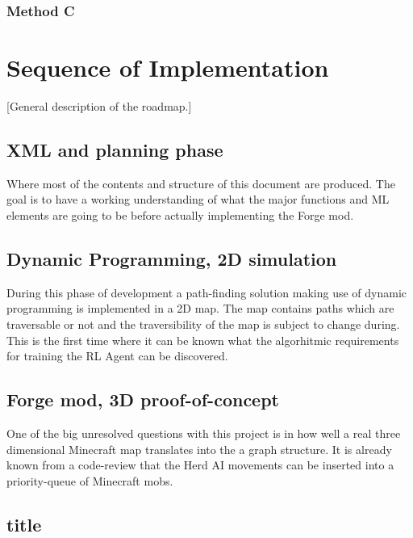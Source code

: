 \documentclass[]{article}
\begin{document}
\subsubsection{Method C}

\newpage

\section{Sequence of Implementation}

[General description of the roadmap.]

\subsection{XML and planning phase}

Where most of the contents and structure of this document are produced. The goal is to have a working understanding of what the major functions and ML elements are going to be before actually implementing the Forge mod.

\subsection{Dynamic Programming, 2D simulation}

During this phase of development a path-finding solution making use of dynamic programming is implemented in a 2D map. The map contains paths which are traversable or not and the traversibility of the map is subject to change during. This is the first time where it can be known what the algorhitmic requirements for training the RL Agent can be discovered.

\subsection{Forge mod, 3D proof-of-concept}

One of the big unresolved questions with this project is in how well a real three dimensional Minecraft map translates into the a graph structure. It is already known from a code-review that the Herd AI movements can be inserted into a priority-queue of Minecraft mobs.

\subsection{title}
\end{document}
